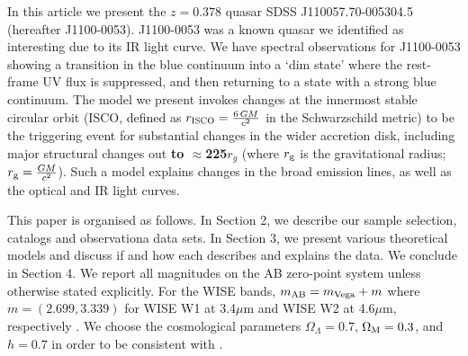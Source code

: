 \documentclass[a4paper,fleqn,usenatbib]{mnras}
\begin{document}
In this article we present the $z=0.378$ quasar SDSS
J110057.70-005304.5 (hereafter J1100-0053).  J1100-0053 was a known
quasar we identified as interesting due to its IR light curve. We have
spectral observations for J1100-0053 showing a transition in the blue
continuum into a `dim state' where the rest-frame UV flux is
suppressed, and then returning to a state with a strong blue
continuum. The model we present invokes changes at the innermost
stable circular orbit (ISCO, defined as $r_{\textsc{ISCO}}={\frac
{6\,GM}{c^{2}}}$ in the Schwarzschild metric) to be the triggering
event for substantial changes in the wider accretion disk, including
major structural changes out {\bf to $\approx$225$r_{g}$} (where $r_{\rm g}$ is the
gravitational radius; $r_{\rm g}=\frac{GM}{c^2}$). Such a model
explains changes in the broad emission lines, as well as the optical
and IR light curves.

This paper is organised as follows. In Section 2, we describe our
sample selection, catalogs and observationa data sets.  In Section 3,
we present various theoretical models and discuss if and how each
describes and explains the data.  We conclude in Section 4.  We report
all magnitudes on the AB zero-point system \citep{Oke_Gunn1983,
Fukugita1996} unless otherwise stated explicitly. For the WISE bands,
$m_{\rm AB} = m_{\rm Vega} + m$ where $m = (2.699, 3.339)$ for WISE W1
at 3.4$\mu$m and WISE W2 at 4.6$\mu$m, respectively
\citep{Cutri2011}. We choose the cosmological parameters
$\Omega_{\Lambda} = 0.7$, $\Omega_{\rm M} = 0.3$, and $h = 0.7$ in
order to be consistent with \citet{Shen2011}.
\end{document}
